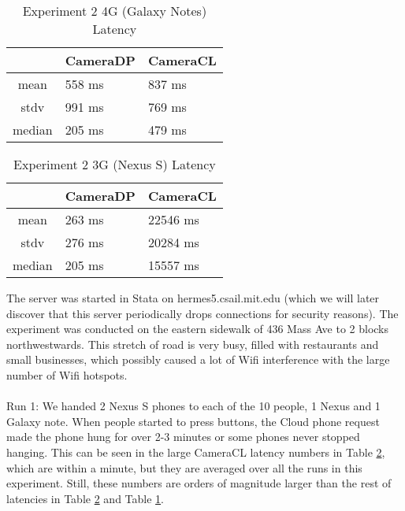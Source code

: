 
\begin{table}[htb]
\begin{scriptsize} 
\caption{Experiment 2 4G (Galaxy Notes) Latency} 
\label{table:exp-2-4g-latency-results}
 \begin{center}
 \begin{tabular}{| c | p{1.5cm} | p{1.5cm} |}
  \hline
  & CameraDP & CameraCL \\
  \hline
  mean & 558 ms & 837 ms\\
  \hline
  stdv & 991 ms & 769 ms \\
  \hline
  median & 205 ms & 479 ms\\
  \hline
  \end{tabular}
  \end{center}
\end{scriptsize}
\end{table}

\begin{table}[htb]
\begin{scriptsize} 
\caption{Experiment 2 3G (Nexus S) Latency} 
\label{table:exp-2-3g-latency-results}
 \begin{center}
 \begin{tabular}{| c | p{1.5cm} | p{1.5cm} |}
  \hline
  & CameraDP & CameraCL \\
  \hline
  mean & 263 ms & 22546 ms \\
  \hline
  stdv & 276 ms & 20284 ms\\
  \hline
  median & 205 ms & 15557 ms\\
  \hline
  \end{tabular}
  \end{center}
\end{scriptsize}
\end{table}

The server was started in Stata on hermes5.csail.mit.edu (which we will later discover that this server periodically drops connections for security reasons). The experiment was conducted on the eastern sidewalk of 436 Mass Ave to 2 blocks northwestwards. This stretch of road is very busy, filled with restaurants and small businesses, which possibly caused a lot of Wifi interference with the large number of Wifi hotspots.
\\
\\
Run 1:
We handed 2 Nexus S phones to each of the 10 people, 1 Nexus and 1 Galaxy note. When people started to press buttons, the Cloud phone request made the phone hung for over 2-3 minutes or some phones never stopped hanging. This can be seen in the large CameraCL latency numbers in Table \ref{table:exp-2-3g-latency-results}, which are within a minute, but they are averaged over all the runs in this experiment. Still, these numbers are orders of magnitude larger than the rest of latencies in Table \ref{table:exp-2-3g-latency-results} and Table \ref{table:exp-2-4g-latency-results}. 

